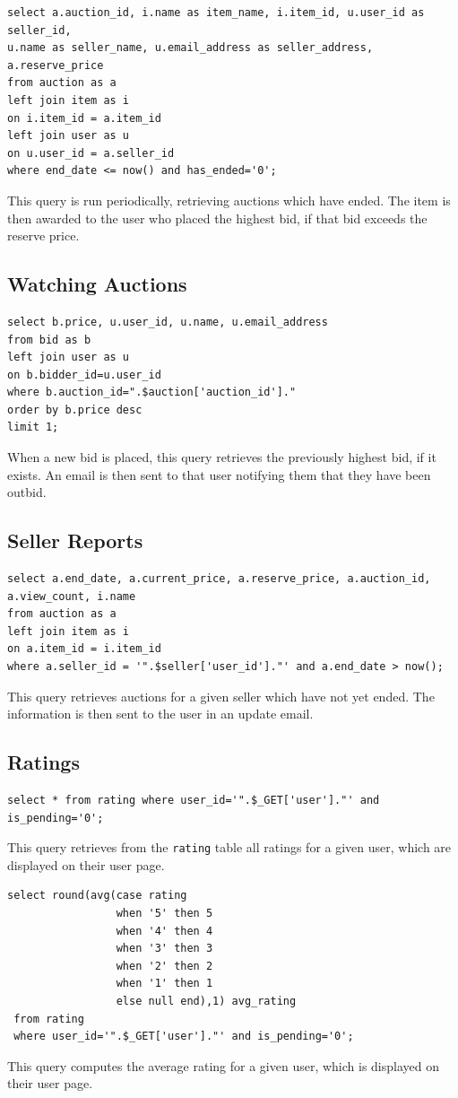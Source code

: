 \documentclass{article}
\begin{document}
\begin{verbatim}
select a.auction_id, i.name as item_name, i.item_id, u.user_id as seller_id,
u.name as seller_name, u.email_address as seller_address, a.reserve_price
from auction as a
left join item as i
on i.item_id = a.item_id
left join user as u
on u.user_id = a.seller_id
where end_date <= now() and has_ended='0';
\end{verbatim}
This query is run periodically, retrieving auctions which have ended. The item is then awarded to the user who placed the highest bid, if that bid exceeds the reserve price.

\subsection{Watching Auctions}
\begin{verbatim}
select b.price, u.user_id, u.name, u.email_address
from bid as b
left join user as u
on b.bidder_id=u.user_id
where b.auction_id=".$auction['auction_id']."
order by b.price desc
limit 1;
\end{verbatim}
When a new bid is placed, this query retrieves the previously highest bid, if it exists. An email is then sent to that user notifying them that they have been outbid.

\subsection{Seller Reports}
\begin{verbatim}
select a.end_date, a.current_price, a.reserve_price, a.auction_id, a.view_count, i.name
from auction as a
left join item as i
on a.item_id = i.item_id
where a.seller_id = '".$seller['user_id']."' and a.end_date > now();
\end{verbatim}
This query retrieves auctions for a given seller which have not yet ended. The information is then sent to the user in an update email.

\subsection{Ratings}
\begin{verbatim}
select * from rating where user_id='".$_GET['user']."' and is_pending='0';
\end{verbatim}
This query retrieves from the \texttt{rating} table all ratings for a given user, which are displayed on their user page.

\begin{verbatim}
select round(avg(case rating
                 when '5' then 5
                 when '4' then 4
                 when '3' then 3
                 when '2' then 2
                 when '1' then 1
                 else null end),1) avg_rating
 from rating
 where user_id='".$_GET['user']."' and is_pending='0';
\end{verbatim}
This query computes the average rating for a given user, which is displayed on their user page.
\end{document}
